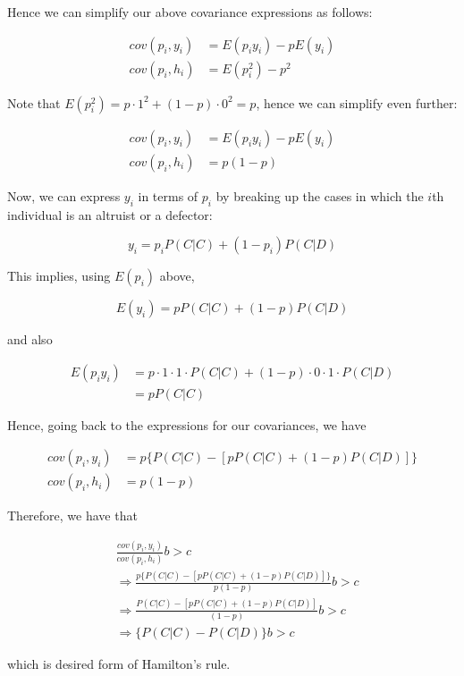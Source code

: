 \documentclass{article}
\begin{document}
Hence we can simplify our above covariance expressions as follows:

\begin{align*}
    cov(p_i, y_i) &= E(p_i y_i) - p E(y_i) \\
    cov(p_i, h_i) &= E(p_i^2) - p^2
\end{align*}

Note that $E(p_i^2) = p \cdot 1^2 + (1 - p) \cdot 0^2 = p$, hence we can
simplify even further:

\begin{align*}
    cov(p_i, y_i) &= E(p_i y_i) - p E(y_i) \\
    cov(p_i, h_i) &= p (1 - p)
\end{align*}

Now, we can express $y_i$ in terms of $p_i$ by breaking up the cases in
which the $i$th individual is an altruist or a defector:

\begin{equation*}
    y_i = p_i P(C|C) + (1 - p_i) P(C|D)
\end{equation*}

This implies, using $E(p_i)$ above,

\begin{equation*}
    E(y_i) = p P(C|C) + (1 - p) P(C|D)
\end{equation*}

and also

\begin{align*}
    E(p_i y_i) &= p \cdot 1 \cdot 1 \cdot P(C|C) + (1 - p) \cdot 0 \cdot 1 \cdot P(C|D) \\
               &= p P(C|C)
\end{align*}

Hence, going back to the expressions for our covariances, we have

\begin{align*}
    cov(p_i, y_i) &= p \{P(C|C) - [p P(C|C) + (1 - p) P(C|D)]\} \\
    cov(p_i, h_i) &= p (1 - p)
\end{align*}

Therefore, we have that

\begin{align*}
    &\frac{cov(p_i, y_i)}{cov(p_i, h_i)} b > c \\
    &\Rightarrow \frac{p \{P(C|C) - [p P(C|C) + (1 - p) P(C|D)]\}}{p (1 - p)} b > c \\
    &\Rightarrow \frac{P(C|C) - [p P(C|C) + (1 - p) P(C|D)]}{(1 - p)} b > c \\
    &\Rightarrow \{P(C|C) - P(C|D)\} b > c
\end{align*}

which is desired form of Hamilton's rule.
\end{document}
